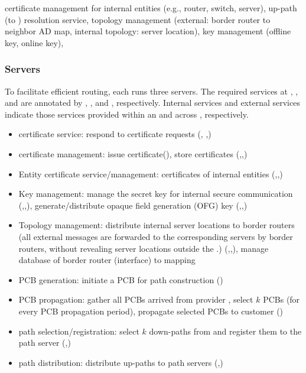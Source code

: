  certificate management for internal entities (e.g., router, switch, server), up-path (to \TDC) resolution service, topology management (external: border router to neighbor AD map, internal topology: server location), key management (offline key, online key), 

\subsubsection{Servers}
To facilitate efficient routing, each \AD runs three servers. The required services at \TDC \AD, \TRAN \AD, and \STUB \AD are annotated by \CAD, \TAD, and \EAD, respectively. Internal services and external services indicate those services provided within an \AD and across \ADs, respectively.

\begin{itemize}
\item \AD certificate service: respond to certificate requests (\CAD, \TAD,\EAD) 
\item \AD certificate management: issue certificate(\CAD), store certificates (\CAD,\TAD,\EAD)
\item Entity certificate service/management: certificates of internal entities (\CAD,\TAD,\EAD)  
\item Key management: manage the secret key for internal secure communication (\CAD,\TAD,\EAD), generate/distribute opaque field generation (OFG) key (\CAD,\TAD,\EAD) 
\item Topology management: distribute internal server locations to border routers (all external messages are forwarded to the corresponding servers by border routers, without revealing server locations outside the \AD.) (\CAD,\TAD,\EAD), manage database of border router (interface) to \AD mapping
\end{itemize}

\begin{itemize}
\item PCB generation: initiate a PCB for path construction (\CAD)
\item PCB propagation: gather all PCBs arrived from provider \ADs, select $k$ PCBs (for every PCB propagation period), propagate selected PCBs to customer \ADs (\TAD)
\item path selection/registration: select $k$ down-paths from \TDC and register them to the \TDC path server (\TAD,\EAD)
\item path distribution: distribute up-paths to path servers (\TAD,\EAD) 
\end{itemize}

